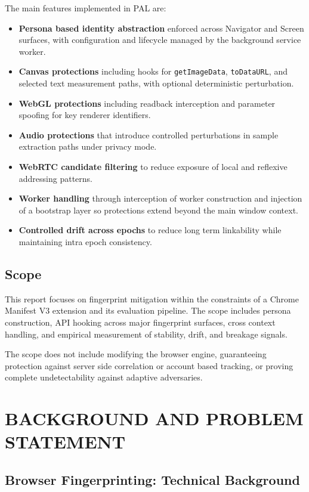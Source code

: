 \documentclass[11pt]{report}
\begin{document}
The main features implemented in PAL are:

\begin{itemize}
    \item \textbf{Persona based identity abstraction} enforced across Navigator and Screen surfaces, with configuration and lifecycle managed by the background service worker.
    \item \textbf{Canvas protections} including hooks for \texttt{getImageData}, \texttt{toDataURL}, and selected text measurement paths, with optional deterministic perturbation.
    \item \textbf{WebGL protections} including readback interception and parameter spoofing for key renderer identifiers.
    \item \textbf{Audio protections} that introduce controlled perturbations in sample extraction paths under privacy mode.
    \item \textbf{WebRTC candidate filtering} to reduce exposure of local and reflexive addressing patterns.
    \item \textbf{Worker handling} through interception of worker construction and injection of a bootstrap layer so protections extend beyond the main window context.
    \item \textbf{Controlled drift across epochs} to reduce long term linkability while maintaining intra epoch consistency.
\end{itemize}

\section{Scope}

This report focuses on fingerprint mitigation within the constraints of a Chrome Manifest V3 extension and its evaluation pipeline. The scope includes persona construction, API hooking across major fingerprint surfaces, cross context handling, and empirical measurement of stability, drift, and breakage signals.

The scope does not include modifying the browser engine, guaranteeing protection against server side correlation or account based tracking, or proving complete undetectability against adaptive adversaries.


\chapter{BACKGROUND AND PROBLEM STATEMENT}

\section{Browser Fingerprinting: Technical Background}
\end{document}
